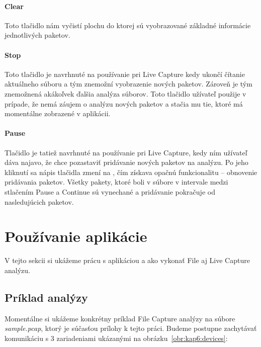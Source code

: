 \paragraph{Clear}
\hfill\break
Toto tlačidlo nám vyčistí plochu do ktorej sú vyobrazované základné informácie jednotlivých paketov.

\paragraph{Stop}
\hfill\break
Toto tlačidlo je navrhnuté na používanie pri Live Capture kedy ukončí čítanie aktuálneho súboru a tým znemožní vyobrazenie nových paketov. Zároveň je tým znemožnená akákoľvek ďalšia analýza súborov. Toto tlačidlo užívateľ použije v prípade, že nemá záujem o analýzu nových paketov a stačia mu tie, ktoré má momentálne zobrazené v aplikácii.

\paragraph{Pause}
\hfill\break
Tlačidlo je tatiež navrhnuté na používanie pri Live Capture, kedy ním užívateľ dáva najavo, že chce pozastaviť pridávanie nových paketov na analýzu. Po jeho kliknutí sa nápis tlačidla zmení na , čím získava opačnú funkcionalitu -- obnovenie pridávania paketov. Všetky pakety, ktoré boli v súbore v intervale medzi stlačením Pause a Continue sú vynechané a pridávanie pokračuje od nasledujúcich paketov.



\section{Používanie aplikácie}
V tejto sekcii si ukážeme prácu s aplikáciou a ako vykonať File aj Live Capture analýzu. 

\subsection{Príklad analýzy}
Momentálne si ukážeme konkrétny príklad File Capture analýzy na súbore \textit{sample.pcap}, ktorý je súčasťou prílohy k tejto práci. Budeme postupne zachytávať komunikáciu s 3 zariadeniami ukázanými na obrázku~\ref{obr:kap6:devices}:

